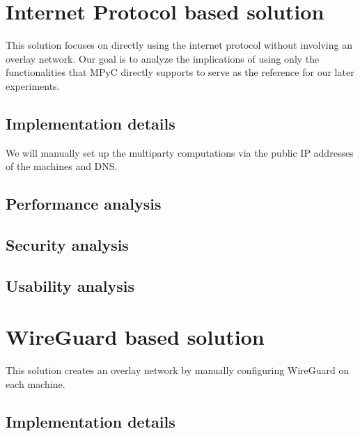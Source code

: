 \hypertarget{internet-protocol-based-solution}{%
\chapter{Internet Protocol based
solution}\label{internet-protocol-based-solution}}

This solution focuses on directly using the internet protocol without
involving an overlay network. Our goal is to analyze the implications of
using only the functionalities that MPyC directly supports to serve as
the reference for our later experiments.

\hypertarget{implementation-details}{%
\section{Implementation details}\label{implementation-details}}

We will manually set up the multiparty computations via the public IP
addresses of the machines and DNS.

\hypertarget{performance-analysis}{%
\section{Performance analysis}\label{performance-analysis}}

\hypertarget{security-analysis}{%
\section{Security analysis}\label{security-analysis}}

\hypertarget{usability-analysis}{%
\section{Usability analysis}\label{usability-analysis}}

\hypertarget{wireguard-based-solution}{%
\chapter{WireGuard based solution}\label{wireguard-based-solution}}

This solution creates an overlay network by manually configuring
WireGuard on each machine.

\hypertarget{implementation-details}{%
\section{Implementation details}\label{implementation-details}}

